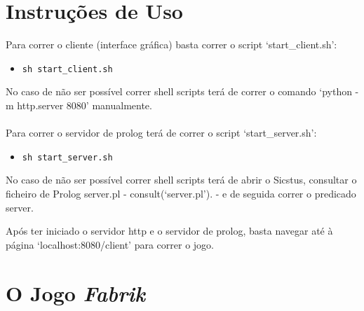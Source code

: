\documentclass[a4paper]{article}
\begin{document}

\newpage


\tableofcontents



\newpage

\section{Instruções de Uso}

Para correr o cliente (interface gráfica) basta correr o script ‘start\_client.sh’:
\begin{itemize}
\item \verb|sh start_client.sh|
\end{itemize}

No caso de não ser possível correr shell scripts terá de correr o comando ‘python -m http.server 8080’ manualmente.
\\
\\
Para correr o servidor de prolog terá de correr o script ‘start\_server.sh’:
\begin{itemize}
\item \verb|sh start_server.sh|
\end{itemize}

No caso de não ser possível correr shell scripts terá de abrir o Sicstus, consultar o ficheiro de Prolog server.pl - consult(‘server.pl’). - e de seguida correr o predicado server.

Após ter iniciado o servidor http e o servidor de prolog, basta navegar até à página ‘localhost:8080/client’ para correr o jogo.


\newpage

\section{O Jogo \textit{Fabrik}}
\end{document}
